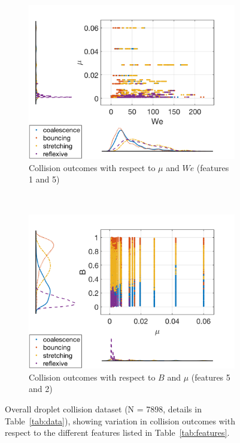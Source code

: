 \documentclass{article}
\begin{document}
\begin{figure}[h!]
\begin{subfigure}[b]{0.4\textwidth}
        \label{fig:data2}
    \end{subfigure}
    ~ %
    \begin{subfigure}[b]{0.4\textwidth}
        \includegraphics[width=\textwidth]{figures/data_scatterhist3.png}
        \caption{\centering Collision outcomes with respect to $\mu$ and $We$ (features 1 and 5)}
        \label{fig:data3}
    \end{subfigure}
        ~ %
    \begin{subfigure}[b]{0.4\textwidth}
        \includegraphics[width=\textwidth]{figures/data_scatterhist4.png}
        \caption{\centering Collision outcomes with respect to $B$ and $\mu$ (features 5 and 2)}
        \label{fig:data4}
    \end{subfigure}
    	\caption{Overall droplet collision dataset (N = 7898, details in Table~\ref{tab:data}), showing variation in collision outcomes with respect to the different features listed in Table~\ref{tab:features}.} \label{fig:animals}
\end{figure}
\end{document}
